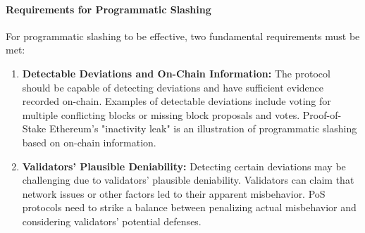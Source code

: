 \paragraph{Requirements for Programmatic Slashing}
For programmatic slashing to be effective, two fundamental requirements must be met:

\begin{enumerate}[label=\Roman*.]
  \item \textbf{Detectable Deviations and On-Chain Information:} The protocol should be capable of detecting deviations and have sufficient evidence recorded on-chain. Examples of detectable deviations include voting for multiple conflicting blocks or missing block proposals and votes. Proof-of-Stake Ethereum's "inactivity leak" is an illustration of programmatic slashing based on on-chain information.
  
  \item \textbf{Validators' Plausible Deniability:} Detecting certain deviations may be challenging due to validators' plausible deniability. Validators can claim that network issues or other factors led to their apparent misbehavior. PoS protocols need to strike a balance between penalizing actual misbehavior and considering validators' potential defenses.
\end{enumerate}

